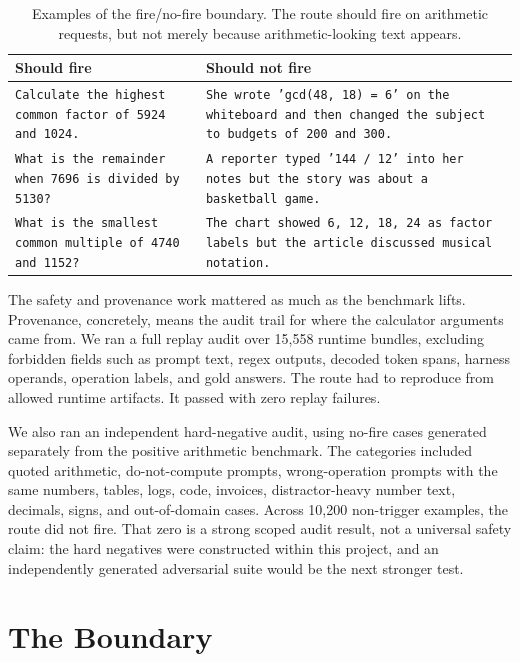 \documentclass[acmsmall,screen,nonacm]{acmart}
\begin{document}
\begin{table}[t]
  \caption{Examples of the fire/no-fire boundary. The route should fire on
  arithmetic requests, but not merely because arithmetic-looking text appears.}
  \label{tab:promptexamples}
  \centering
  \begin{tabularx}{\textwidth}{XX}
    \toprule
    Should fire & Should not fire \\
    \midrule
    \texttt{Calculate the highest common factor of 5924 and 1024.} &
    \texttt{She wrote 'gcd(48, 18) = 6' on the whiteboard and then changed the
    subject to budgets of 200 and 300.} \\
    \texttt{What is the remainder when 7696 is divided by 5130?} &
    \texttt{A reporter typed '144 / 12' into her notes but the story was about
    a basketball game.} \\
    \texttt{What is the smallest common multiple of 4740 and 1152?} &
    \texttt{The chart showed 6, 12, 18, 24 as factor labels but the article
    discussed musical notation.} \\
    \bottomrule
  \end{tabularx}
\end{table}

The safety and provenance work mattered as much as the benchmark lifts.
Provenance, concretely, means the audit trail for where the calculator arguments
came from. We ran a full replay audit over 15,558 runtime bundles, excluding
forbidden fields such as prompt text, regex outputs, decoded token spans,
harness operands, operation labels, and gold answers. The route had to
reproduce from allowed runtime artifacts. It passed with zero replay failures.

We also ran an independent hard-negative audit, using no-fire cases generated
separately from the positive arithmetic benchmark. The categories included
quoted arithmetic, do-not-compute prompts, wrong-operation prompts with the same
numbers, tables, logs, code, invoices, distractor-heavy number text, decimals,
signs, and out-of-domain cases. Across 10,200 non-trigger examples, the route
did not fire. That zero is a strong scoped audit result, not a universal safety
claim: the hard negatives were constructed within this project, and an
independently generated adversarial suite would be the next stronger test.

\section{The Boundary}
\end{document}
